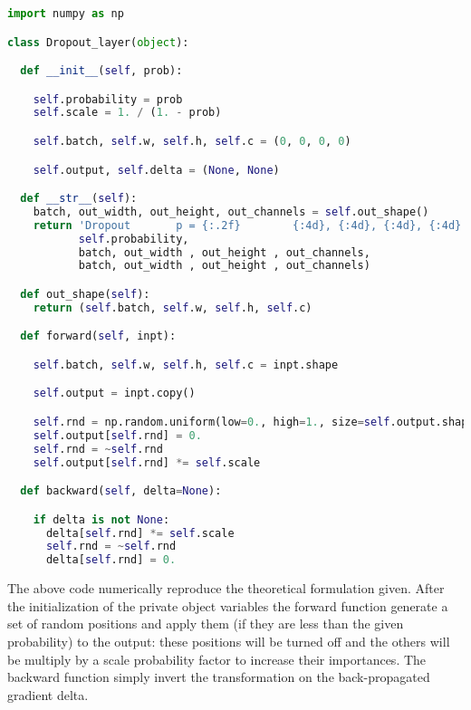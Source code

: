 \documentclass{standalone}
\begin{document}
\lstset{style=snippet}
\begin{lstlisting}[language=Python, caption=NumPyNet version of Dropout function, label=code:py_dropout]
import numpy as np

class Dropout_layer(object):

  def __init__(self, prob):

    self.probability = prob
    self.scale = 1. / (1. - prob)

    self.batch, self.w, self.h, self.c = (0, 0, 0, 0)

    self.output, self.delta = (None, None)

  def __str__(self):
    batch, out_width, out_height, out_channels = self.out_shape()
    return 'Dropout       p = {:.2f}        {:4d}, {:4d}, {:4d}, {:4d}  ->  {:4d}, {:4d}, {:4d}, {:4d}'.format(
           self.probability,
           batch, out_width , out_height , out_channels,
           batch, out_width , out_height , out_channels)

  def out_shape(self):
    return (self.batch, self.w, self.h, self.c)

  def forward(self, inpt):

    self.batch, self.w, self.h, self.c = inpt.shape

    self.output = inpt.copy()

    self.rnd = np.random.uniform(low=0., high=1., size=self.output.shape) < self.probability
    self.output[self.rnd] = 0.
    self.rnd = ~self.rnd
    self.output[self.rnd] *= self.scale

  def backward(self, delta=None):

    if delta is not None:
      delta[self.rnd] *= self.scale
      self.rnd = ~self.rnd
      delta[self.rnd] = 0.

\end{lstlisting}

The above code numerically reproduce the theoretical formulation given.
After the initialization of the private object variables the forward function generate a set of random positions and apply them (if they are less than the given probability) to the output: these positions will be turned off and the others will be multiply by a scale probability factor to increase their importances.
The backward function simply invert the transformation on the back-propagated gradient \textsf{delta}.
\end{document}
